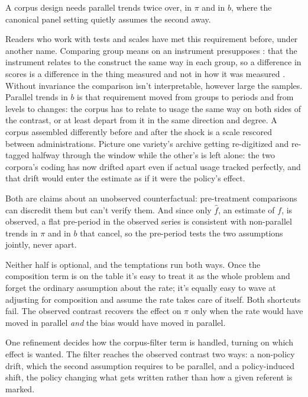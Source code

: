 A corpus design needs parallel trends twice over, in $\pi$ and in $b$, where the canonical panel setting quietly assumes the second away.

Readers who work with tests and scales have met this requirement before, under another name. Comparing group means on an instrument presupposes : that the instrument relates to the construct the same way in each group, so a difference in scores is a difference in the thing measured and not in how it was measured \citep{meredith1993measurementInvariance,millsap2011measurementInvariance}. Without invariance the comparison isn't interpretable, however large the samples. Parallel trends in $b$ is that requirement moved from groups to periods and from levels to changes: the corpus has to relate to usage the same way on both sides of the contrast, or at least depart from it in the same direction and degree. A corpus assembled differently before and after the shock is a scale rescored between administrations. Picture one variety's archive getting re-digitized and re-tagged halfway through the window while the other's is left alone: the two corpora's coding has now drifted apart even if actual usage tracked perfectly, and that drift would enter the estimate as if it were the policy's effect.

Both are claims about an unobserved counterfactual: pre-treatment comparisons can discredit them but can't verify them. And since only $\hat f$, an estimate of $f$, is observed, a flat pre-period in the observed series is consistent with non-parallel trends in $\pi$ and in $b$ that cancel, so the pre-period tests the two assumptions jointly, never apart.

Neither half is optional, and the temptations run both ways. Once the composition term is on the table it's easy to treat it as the whole problem and forget the ordinary assumption about the rate; it's equally easy to wave at adjusting for composition and assume the rate takes care of itself. Both shortcuts fail. The observed contrast recovers the effect on $\pi$ only when the rate would have moved in parallel \emph{and} the bias would have moved in parallel.

One refinement decides how the corpus-filter term is handled, turning on which effect is wanted. The filter reaches the observed contrast two ways: a non-policy drift, which the second assumption requires to be parallel, and a policy-induced shift, the policy changing what gets written rather than how a given referent is marked.


